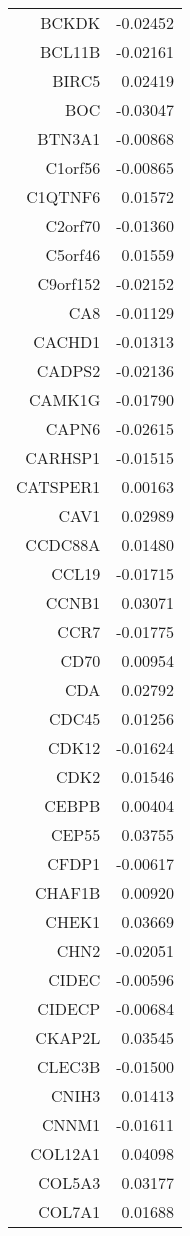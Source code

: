 \begin{longtable}{rr}
  BCKDK & -0.02452 \\ 
  BCL11B & -0.02161 \\ 
  BIRC5 & 0.02419 \\ 
  BOC & -0.03047 \\ 
  BTN3A1 & -0.00868 \\ 
  C1orf56 & -0.00865 \\ 
  C1QTNF6 & 0.01572 \\ 
  C2orf70 & -0.01360 \\ 
  C5orf46 & 0.01559 \\ 
  C9orf152 & -0.02152 \\ 
  CA8 & -0.01129 \\ 
  CACHD1 & -0.01313 \\ 
  CADPS2 & -0.02136 \\ 
  CAMK1G & -0.01790 \\ 
  CAPN6 & -0.02615 \\ 
  CARHSP1 & -0.01515 \\ 
  CATSPER1 & 0.00163 \\ 
  CAV1 & 0.02989 \\ 
  CCDC88A & 0.01480 \\ 
  CCL19 & -0.01715 \\ 
  CCNB1 & 0.03071 \\ 
  CCR7 & -0.01775 \\ 
  CD70 & 0.00954 \\ 
  CDA & 0.02792 \\ 
  CDC45 & 0.01256 \\ 
  CDK12 & -0.01624 \\ 
  CDK2 & 0.01546 \\ 
  CEBPB & 0.00404 \\ 
  CEP55 & 0.03755 \\ 
  CFDP1 & -0.00617 \\ 
  CHAF1B & 0.00920 \\ 
  CHEK1 & 0.03669 \\ 
  CHN2 & -0.02051 \\ 
  CIDEC & -0.00596 \\ 
  CIDECP & -0.00684 \\ 
  CKAP2L & 0.03545 \\ 
  CLEC3B & -0.01500 \\ 
  CNIH3 & 0.01413 \\ 
  CNNM1 & -0.01611 \\ 
  COL12A1 & 0.04098 \\ 
  COL5A3 & 0.03177 \\ 
  COL7A1 & 0.01688 \\ 

\end{longtable}
